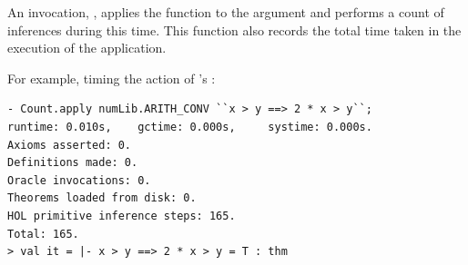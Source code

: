 An invocation, , applies the function  to
the argument  and performs a count of inferences during this
time.  This function also records the total time taken in the
execution of the application.

For example, timing the action of 's :

\setcounter{sessioncount}{1}
\begin{session}
\begin{verbatim}
- Count.apply numLib.ARITH_CONV ``x > y ==> 2 * x > y``;
runtime: 0.010s,    gctime: 0.000s,     systime: 0.000s.
Axioms asserted: 0.
Definitions made: 0.
Oracle invocations: 0.
Theorems loaded from disk: 0.
HOL primitive inference steps: 165.
Total: 165.
> val it = |- x > y ==> 2 * x > y = T : thm
\end{verbatim}
\end{session}






